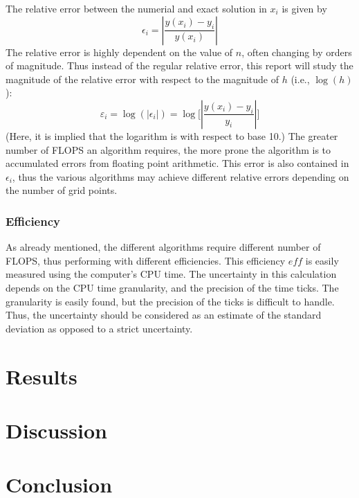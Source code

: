 \documentclass[reprint,english]{revtex4-1}
\begin{document}
The relative error between the numerial and exact solution in \(x_i\) is given by
\begin{equation}\label{eq:relative_error}
\epsilon_i=\left|\frac{y(x_i)-y_i}{y(x_i)}\right|
\end{equation}
The relative error is highly dependent on the value of \(n\), often changing by orders of magnitude. Thus instead of the regular relative error, this report will study the magnitude of the relative error with respect to the magnitude of \(h\) (i.e., \(\log(h)\)):
\begin{equation}\label{eq:relative_error_magnitude}
\varepsilon_i=\log(|\epsilon_i|)=\log\bigg[\left|\frac{y(x_i)-y_i}{y_i}\right|\bigg]
\end{equation}
(Here, it is implied that the logarithm is with respect to base 10.)
The greater number of FLOPS an algorithm requires, the more prone the algorithm is to accumulated errors from floating point arithmetic. This error is also contained in \(\epsilon_i\), thus the various algorithms may achieve different relative errors depending on the number of grid points.
\subsubsection{Efficiency}
As already mentioned, the different algorithms require different number of FLOPS, thus performing with different efficiencies. This efficiency \(eff\) is easily measured using the computer's CPU time. The uncertainty in this calculation depends on the CPU time granularity, and the precision of the time ticks. The granularity is easily found, but the precision of the ticks is difficult to handle. Thus, the uncertainty should be considered as an estimate of the standard deviation as opposed to a strict uncertainty.
\clearpage
\section{Results}



















\clearpage
\section{Discussion}
\section{Conclusion}
%
%
	 
\end{document}
